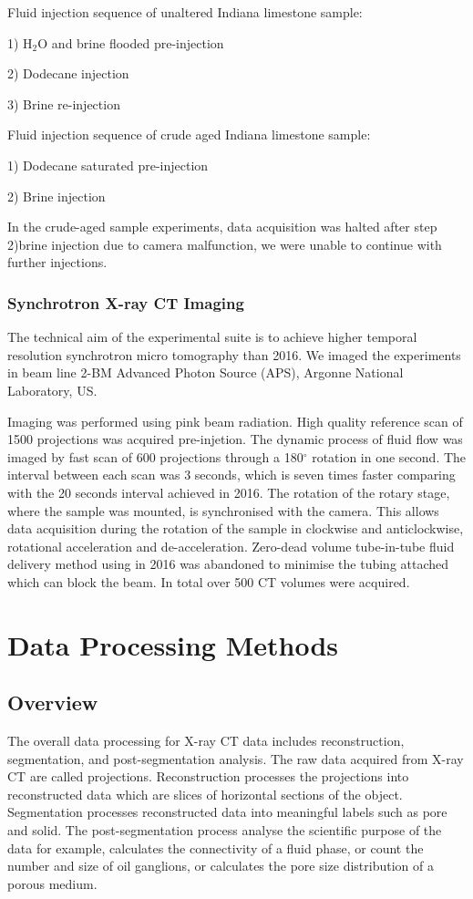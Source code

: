Fluid injection sequence of unaltered Indiana limestone sample:

1) H$_2$O and brine flooded pre-injection

2) Dodecane injection 

3) Brine re-injection

Fluid injection sequence of crude aged Indiana limestone sample:

1) Dodecane saturated pre-injection

2) Brine injection

In the crude-aged sample experiments, data acquisition was halted after step 2)brine injection due to camera malfunction, we were unable to continue with further injections.

\subsubsection{Synchrotron X-ray \textmu CT Imaging}
The technical aim of the experimental suite is to achieve higher temporal resolution synchrotron micro tomography than 2016. We imaged the experiments in beam line 2-BM Advanced Photon Source (APS), Argonne National Laboratory, US. 

Imaging was performed using pink beam radiation. High quality reference scan of 1500 projections was acquired pre-injetion. The dynamic process of fluid flow was imaged by fast scan of 600 projections through a 180$^{\circ}$ rotation in one second. The interval between each scan was 3 seconds, which is seven times faster comparing with the 20 seconds interval achieved in 2016.  The rotation of the rotary stage, where the sample was mounted, is synchronised with the camera. This allows data acquisition during the rotation of the sample in clockwise and anticlockwise, rotational acceleration and de-acceleration. Zero-dead volume tube-in-tube fluid delivery method using in 2016 was abandoned to minimise the tubing attached which can block the beam. In total over 500 \textmu CT volumes were acquired. 

\section{Data Processing Methods}
\subsection{Overview}
The overall data processing for X-ray CT data includes reconstruction, segmentation, and post-segmentation analysis. The raw data acquired from X-ray CT are called projections. Reconstruction processes the projections into reconstructed data which are slices of horizontal sections of the object. Segmentation processes reconstructed data into meaningful labels such as pore and solid. The post-segmentation process analyse the scientific purpose of the data for example, calculates the connectivity of a fluid phase, or count the number and size of oil ganglions, or calculates the pore size distribution of a porous medium.

